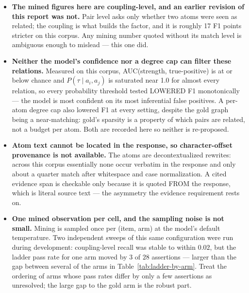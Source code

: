 \documentclass[11pt]{article}
\begin{document}
\begin{itemize}
\item \textbf{The mined figures here are coupling-level, and an earlier revision of this report was not.} Pair level asks only whether two atoms were seen as related; the coupling is what builds the factor, and it is roughly 17 F1 points stricter on this corpus. Any mining number quoted without its match level is ambiguous enough to mislead --- this one did.
\item \textbf{Neither the model's confidence nor a degree cap can filter these relations.} Measured on this corpus, AUC(strength, true-positive) is at or below chance and $P(\tau \mid a_i,a_j)$ is saturated near 1.0 for almost every relation, so every probability threshold tested LOWERED F1 monotonically --- the model is most confident on its most inferential false positives. A per-atom degree cap also lowered F1 at every setting, despite the gold graph being a near-matching: gold's sparsity is a property of which pairs are related, not a budget per atom. Both are recorded here so neither is re-proposed.
\item \textbf{Atom text cannot be located in the response, so character-offset provenance is not available.} The atoms are decontextualized rewrites: across this corpus essentially none occur verbatim in the response and only about a quarter match after whitespace and case normalization. A cited evidence span is checkable only because it is quoted FROM the response, which is literal source text --- the asymmetry the evidence requirement rests on.
\item \textbf{One mined observation per cell, and the sampling noise is not small.} Mining is sampled once per (item, arm) at the model's default temperature. Two independent sweeps of this same configuration were run during development: coupling-level recall was stable to within $0.02$, but the ladder pass rate for one arm moved by $3$ of $28$ assertions --- larger than the gap between several of the arms in Table~\ref{tab:ladder-by-arm}. Treat the ordering of arms whose pass rates differ by only a few assertions as unresolved; the large gap to the gold arm is the robust part.
\end{itemize}
\end{document}
